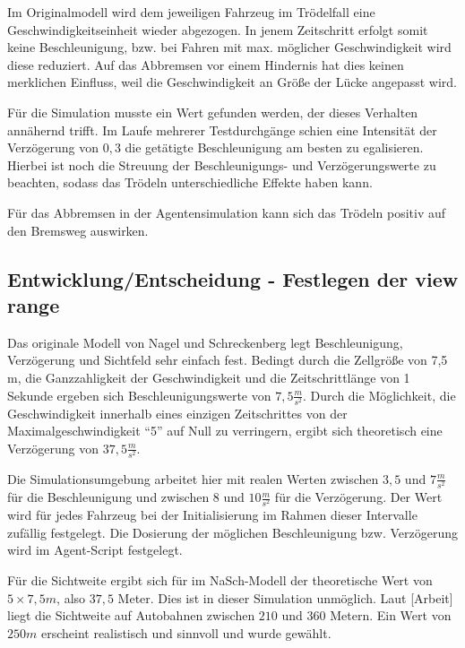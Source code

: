 Im Originalmodell wird dem jeweiligen Fahrzeug im Trödelfall eine Geschwindigkeitseinheit wieder abgezogen. 
In jenem Zeitschritt erfolgt somit keine Beschleunigung, bzw. bei Fahren mit max. möglicher Geschwindigkeit wird diese reduziert. 
Auf das Abbremsen vor einem Hindernis hat dies keinen merklichen Einfluss, weil die Geschwindigkeit an Größe der Lücke angepasst wird.

Für die Simulation musste ein Wert gefunden werden, der dieses Verhalten annähernd trifft.
Im Laufe mehrerer Testdurchgänge schien eine Intensität der Verzögerung von $0,3$ die getätigte Beschleunigung am besten zu egalisieren. 
Hierbei ist noch die Streuung der Beschleunigungs- und Verzögerungswerte zu beachten, sodass das Trödeln unterschiedliche Effekte haben kann.

Für das Abbremsen in der Agentensimulation kann sich das Trödeln positiv auf den Bremsweg auswirken.



\subsection{Entwicklung/Entscheidung - Festlegen der view range}

Das originale Modell von Nagel und Schreckenberg legt Beschleunigung, Verzögerung und Sichtfeld sehr einfach fest.
Bedingt durch die Zellgröße von 7,5 m, die Ganzzahligkeit der Geschwindigkeit und die Zeitschrittlänge von 1 Sekunde ergeben sich Beschleunigungswerte von $7,5 \frac{m}{s^{2}}$. 
Durch die Möglichkeit, die Geschwindigkeit innerhalb eines einzigen Zeitschrittes von der Maximalgeschwindigkeit \enquote{5} auf Null zu verringern, ergibt sich theoretisch eine Verzögerung von $37,5 \frac{m}{s^{2}}$.

Die Simulationsumgebung arbeitet hier mit realen Werten zwischen $3,5$ und $7 \frac{m}{s^{2}}$ für die Beschleunigung und zwischen $8$ und $10 \frac{m}{s^{2}}$ für die Verzögerung.
Der Wert wird für jedes Fahrzeug bei der Initialisierung im Rahmen dieser Intervalle zufällig festgelegt.
Die Dosierung der möglichen Beschleunigung bzw. Verzögerung wird im Agent-Script festgelegt.

Für die Sichtweite ergibt sich für im NaSch-Modell der theoretische Wert von $5 \times 7,5 m$, also $37,5$ Meter.
Dies ist in dieser Simulation unmöglich.
Laut [Arbeit] liegt die Sichtweite auf Autobahnen zwischen $210$ und $360$ Metern.
Ein Wert von $250 m$ erscheint realistisch und sinnvoll und wurde gewählt.




